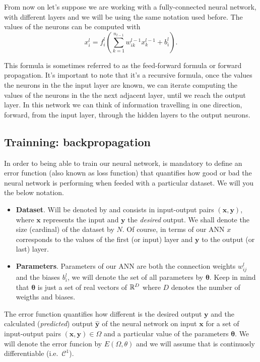 From now on let's suppose we are working with a fully-connected neural network,
with different layers and we will be using the same notation used before. The
values of the neurons can be computed with
\begin{equation}
  x_i^l = f_i^l \left( \sum_{k=1}^{n_{l-1}} w_{ik}^{l-1} x_{k}^{l-1} + b_i^l \right).
\end{equation}

This formula is sometimes referred to as the feed-forward formula or forward
propagation. It's important to note that it's a recursive formula, once the
values the neurons in the the input layer are known, we can iterate computing
the values of the neurons in the the next adjacent layer, until we reach the
output layer. In this network we can think of information travelling in one
direction, forward, from the input layer, through the hidden layers to the
output neurons.

\subsection{Trainning: backpropagation}
\label{sec:backward}

In order to being able to train our neural network, is mandatory to define an
error function (also known as loss function) that quantifies how good or bad
the neural network is performing when feeded with a particular dataset. We will
you the below notation.
\begin{itemize}
  \item \textbf{Dataset}. Will be denoted by and consists in input-output pairs
  \((\mathbf{x}, \mathbf{y})\), where \(\mathbf{x}\) represents the input and
  \(\mathbf{y}\) the \emph{desired} output. We shall denote the size (cardinal)
  of the dataset by \(N\). Of course, in terms of our ANN \(x\) corresponds to
  the values of the first (or input) layer and \(\mathbf{y}\) to the output (or
  last) layer.
  \item \textbf{Parameters}. Parameters of our ANN are both the connection
  weights \(w_{ij}^l\) and the biases \(b_i^l\), we will denote the set of all
  parameters by \(\bm{\theta}\). Keep in mind that \(\bm{\theta}\) is just a
  set of real vectors of \(\mathbb{R}^D\) where \(D\) denotes the number of weigths and
  biases.
\end{itemize}

The error function quantifies how different is the desired output
\(\mathbf{y}\) and the calculated (\emph{predicted}) output
\(\mathbf{\hat{y}}\) of the neural network on input \(\mathbf{x}\) for a set of
input-output pairs \((\mathbf{x}, \mathbf{y}) \in \Omega\) and a particular
value of the parameters \(\bm{\theta}\). We will denote the error funcion by
\(E(\Omega, \theta)\) and we will assume that is continuosly differentiable
(i.e.\ \(\mathcal{C}^1\)).


